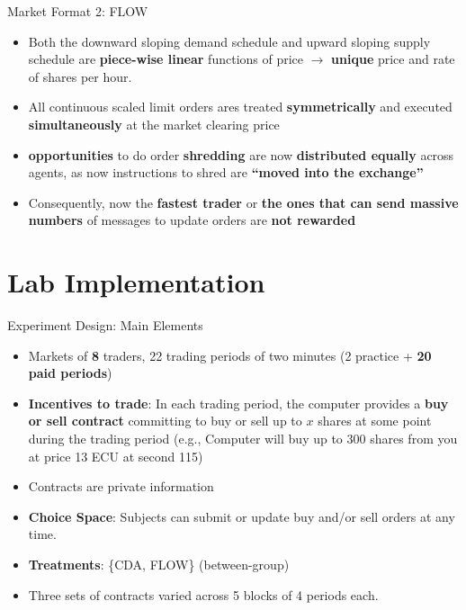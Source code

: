 \documentclass[10pt]{beamer}
\begin{document}
\begin{frame}{Market Format 2: FLOW}
\begin{itemize}
\item Both the downward sloping demand schedule and upward sloping supply schedule are \textbf{piece-wise linear} functions of price $\rightarrow$ \textbf{unique} price and rate of shares per hour. %
\item All continuous scaled limit orders ares treated \textbf{symmetrically} and executed \textbf{simultaneously} at the market clearing price %
        \item \textbf{opportunities} to do order \textbf{shredding} are now \textbf{distributed equally} across agents, as now instructions to shred are \textbf{``moved into the exchange''} %
        \item Consequently, now the
        \textbf{fastest trader} or \textbf{the ones that can send massive numbers} of messages to update orders are \textbf{not rewarded}
    \end{itemize}
\end{frame}

\section{Lab Implementation}

\begin{frame}{Experiment Design: Main Elements}
    \begin{itemize}
        \item Markets of \textbf{8} traders, 22 trading periods of two minutes (2 practice + \textbf{20 paid periods})
        \item \textbf{Incentives to trade}: In each trading period, the computer provides a \textbf{buy or sell contract} committing to buy or sell up to $x$ shares at some point during the trading period (e.g., Computer will buy up to 300 shares from you at price 13 ECU at second 115) 
        \item Contracts are private information %
        \item \textbf{Choice Space}: Subjects can submit or update buy and/or sell orders at any time. %
        \item \textbf{Treatments}: \{CDA, FLOW\} (between-group)
        \item Three sets of contracts varied across 5 blocks of 4 periods each. 
    \end{itemize}
\end{frame}
\end{document}

